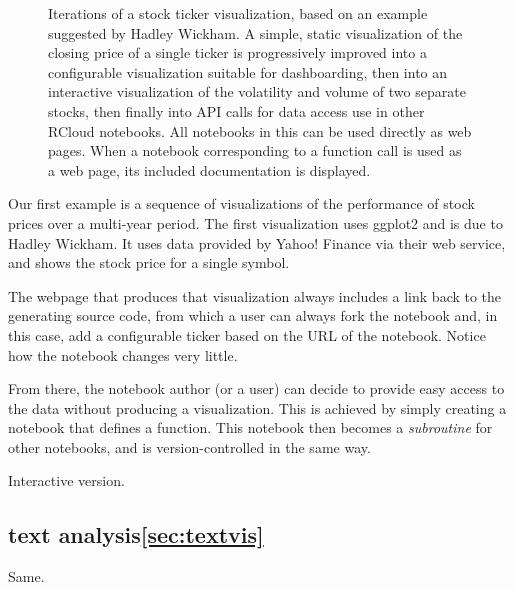 \begin{figure}
\caption{\label{sec:stockvis}Iterations of a stock ticker
  visualization, based on an example suggested by Hadley Wickham.  A
  simple, static visualization of the closing price of a single ticker
  is progressively improved into a configurable visualization suitable
  for dashboarding, then into an interactive visualization of the
  volatility and volume of two separate stocks, then finally into API
  calls for data access use in other RCloud notebooks. All notebooks
  in this can be used directly as web pages. When a notebook
  corresponding to a function call is used as a web page, its included
  documentation is displayed.}
\end{figure}

Our first example is a sequence of visualizations of the performance
of stock prices over a multi-year period. The first visualization uses
ggplot2 and is due to Hadley Wickham. It uses data provided by Yahoo!
Finance via their web service, and shows the stock price for a single
symbol.

The webpage that produces that visualization always includes a link
back to the generating source code, from which a user can always fork
the notebook and, in this case, add a configurable ticker based on the
URL of the notebook. Notice how the notebook changes very little.

From there, the notebook author (or a user) can decide to provide easy
access to the data without producing a visualization. This is achieved
by simply creating a notebook that defines a function. This notebook
then becomes a \emph{subroutine} for other notebooks, and is
version-controlled in the same way.

Interactive version.






\subsection{text analysis\ref{sec:textvis}}

Same.

%
